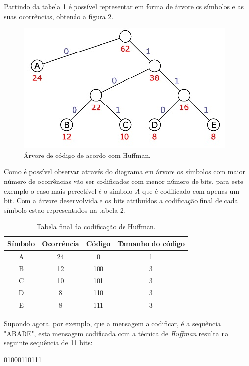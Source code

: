 \documentclass[12pt,a4paper]{article}
\begin{document}
Partindo da tabela 1 é possível representar em forma de árvore os símbolos e as suas ocorrências, obtendo a figura 2.
\newpage
\begin{figure}[h]
\centering
\includegraphics{arvore.jpg}
\caption{Árvore de código de acordo com Huffman.}
\end{figure}

Como é possível observar através do diagrama em árvore os símbolos com maior número de ocorrências vão ser codificados com menor número de bits, para este exemplo o caso mais percetível é o símbolo \textit{A} que é codificado com apenas um bit. Com a árvore desenvolvida e os bits atribuídos a codificação final de cada símbolo estão representados na tabela 2.

\begin{table}[h]
\centering
\label{my-label}
\begin{tabular}{|c|c|c|c|}
\hline
Símbolo & Ocorrência & Código & Tamanho do código \\ \hline
A       & 24         & 0      & 1                 \\ \hline
B       & 12         & 100    & 3                 \\ \hline
C       & 10         & 101    & 3                 \\ \hline
D       & 8          & 110    & 3                 \\ \hline
E       & 8          & 111    & 3                 \\ \hline
\end{tabular}
\caption{Tabela final da codificação de Huffman.}
\end{table}

Supondo agora, por exemplo, que a mensagem a codificar, é a sequência "ABADE", esta mensagem codificada com a técnica de \textit{Huffman} resulta na seguinte sequência de 11 bits:
\begin{center}
   01000110111
   \end{center} 
\newpage
\end{document}
